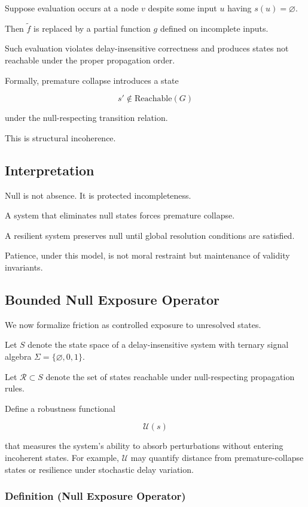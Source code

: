 \documentclass[12pt]{article}
\begin{document}
Suppose evaluation occurs at a node $v$ despite some input $u$ having $s(u) = \varnothing$.

Then $\tilde{f}$ is replaced by a partial function $g$ defined on incomplete inputs.

Such evaluation violates delay-insensitive correctness and produces states not reachable under the proper propagation order.

Formally, premature collapse introduces a state

\[
s' \notin \text{Reachable}(G)
\]

under the null-respecting transition relation.

This is structural incoherence.

\subsection{Interpretation}

Null is not absence. It is protected incompleteness.

A system that eliminates null states forces premature collapse.

A resilient system preserves null until global resolution conditions are satisfied.

Patience, under this model, is not moral restraint but maintenance of validity invariants.

\subsection{Bounded Null Exposure Operator}

We now formalize friction as controlled exposure to unresolved states.

Let $S$ denote the state space of a delay-insensitive system with ternary signal algebra $\Sigma = \{\varnothing,0,1\}$.

Let $\mathcal{R} \subset S$ denote the set of states reachable under null-respecting propagation rules.

Define a robustness functional

\[
\mathcal{U}(s)
\]

that measures the system's ability to absorb perturbations without entering incoherent states. For example, $\mathcal{U}$ may quantify distance from premature-collapse states or resilience under stochastic delay variation.

\subsubsection*{Definition (Null Exposure Operator)}
\end{document}
